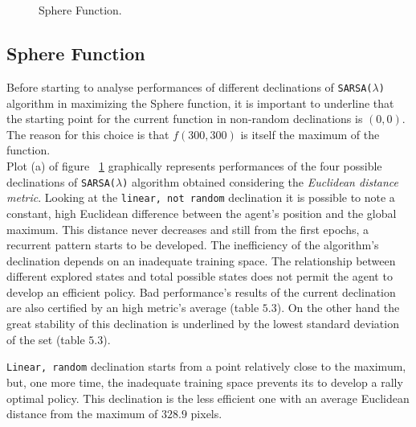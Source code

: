 \begin{figure}[h!]
	\begin{center}
		\\
		 \\
		
	\end{center}
	\caption{
		Sphere Function.
	}
	\label{fig:ParabolicResults}
\end{figure}


\subsection{Sphere Function} Before starting to analyse performances of different declinations of {\tt SARSA($\lambda$)} algorithm in maximizing the Sphere function, it is important to underline that the starting point for the current function in non-random declinations is $(0, 0)$. The reason for this choice is that $f(300, 300)$ is itself the maximum of the function. \\

Plot (a) of figure ~\ref{fig:ParabolicResults} graphically represents performances of the four possible declinations of {\tt SARSA($\lambda$)} algorithm obtained considering the \textit{Euclidean distance metric}. Looking at the {\tt linear, not random} declination it is possible to note a constant, high Euclidean difference between the agent's position and the global maximum. This distance never decreases and still from the first epochs, a recurrent pattern starts to be developed. The inefficiency of the algorithm's declination depends on an inadequate training space. The relationship between different explored states and total possible states does not permit the agent to develop an efficient policy. Bad performance's results of the current declination are also certified by an high metric's average (table $5.3$). On the other hand the great stability of this declination is underlined by the lowest standard deviation of the set (table $5.3$).

{\tt Linear, random} declination starts from a point relatively close to the maximum, but, one more time, the inadequate training space prevents its to develop a rally optimal policy. This declination is the less efficient one with an average Euclidean distance from the maximum of $328.9$ pixels.

